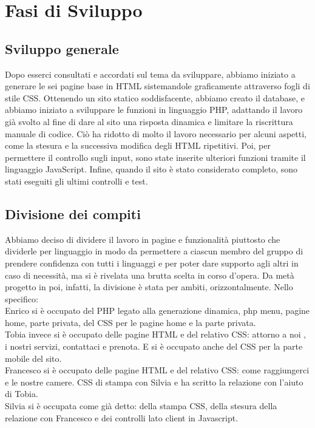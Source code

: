 \section{Fasi di Sviluppo}
\subsection{Sviluppo generale}
Dopo esserci consultati e accordati sul tema da sviluppare, abbiamo iniziato a generare le sei pagine base in HTML sistemandole graficamente attraverso fogli di stile CSS. Ottenendo un sito statico soddisfacente, abbiamo creato il database, e abbiamo iniziato a sviluppare le funzioni in linguaggio PHP, adattando il lavoro già svolto al fine di dare al sito una risposta dinamica e limitare la riscrittura manuale di codice. Ciò ha ridotto di molto il lavoro necessario per alcuni aspetti, come la stesura e la successiva modifica degli HTML ripetitivi. Poi, per permettere il controllo sugli input, sono state inserite ulteriori funzioni tramite il linguaggio JavaScript. Infine, quando il sito è stato considerato completo, sono stati eseguiti gli ultimi controlli e test.
\subsection{Divisione dei compiti}
Abbiamo deciso di dividere il lavoro in pagine e funzionalità piuttosto che dividerle per linguaggio in modo da permettere a ciascun membro del gruppo di prendere confidenza con tutti i linguaggi e per poter dare supporto agli altri in caso di necessità, ma si è rivelata una brutta scelta in corso d’opera. Da metà progetto in poi, infatti, la divisione è stata per ambiti, orizzontalmente. 
Nello specifico:\\

Enrico si è occupato del PHP legato alla generazione dinamica, php menu, pagine home, parte privata, del CSS per le pagine home e la parte privata.\\

Tobia invece si è occupato delle pagine HTML e del relativo CSS: attorno a noi , i nostri servizi, contattaci e prenota. E si è occupato anche del CSS per la parte mobile del sito.\\

Francesco si è occupato delle pagine HTML e del relativo CSS: come raggiungerci e le nostre camere. CSS di stampa con Silvia e ha scritto la relazione con l'aiuto di Tobia.\\

Silvia si è occupata come già detto: della stampa CSS, della stesura della relazione con Francesco e dei controlli lato client in Javascript. 